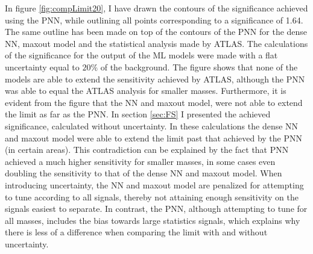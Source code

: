 In figure \ref{fig:compLimit20}, I have drawn the contours of the significance achieved using the \ac{PNN},
while outlining all points corresponding to a significance of 1.64. The same outline has been made on top of the 
contours of the \ac{PNN} for the dense \ac{NN}, maxout model and the statistical analysis made by ATLAS. The calculations
of the significance for the output of the \ac{ML} models were made with a flat uncertainty equal to $20\%$ of the background.
The figure shows that none of the models are able to extend the sensitivity achieved by ATLAS, although the \ac{PNN} was able to equal
the ATLAS analysis for smaller masses. Furthermore, it is evident from the figure that the \ac{NN} and maxout model, were not able to 
extend the limit as far as the \ac{PNN}. In section \ref{sec:FS} I presented the achieved significance, calculated without uncertainty. In these
calculations the dense \ac{NN} and maxout model were able to extend the limit past that achieved by the \ac{PNN} (in certain areas). 
This contradiction can be explained by the fact that \ac{PNN} achieved a much higher sensitivity for smaller masses, in some cases even 
doubling the sensitivity to that of the dense \ac{NN} and maxout model. When introducing uncertainty, the \ac{NN} and maxout model are 
penalized for attempting to tune according to all signals, thereby not attaining enough sensitivity on the signals easiest to separate.
In contrast, the \ac{PNN}, although attempting to tune for all masses, includes the bias towards large statistics signals, which explains why there 
is less of a difference when comparing the limit with and without uncertainty.\\
